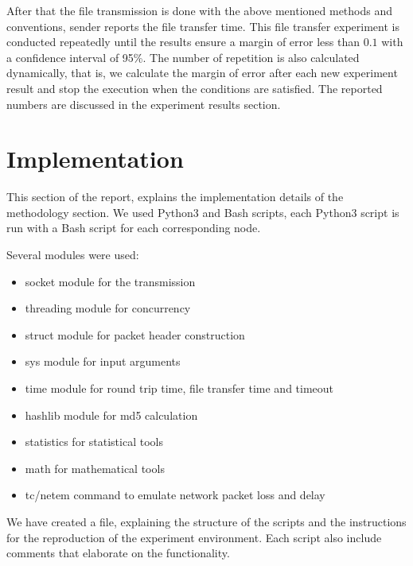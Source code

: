 \documentclass[conference]{IEEEtran}
\begin{document}
    After that the file transmission is done with the above mentioned methods and conventions, sender reports the file transfer time. This file transfer experiment is conducted repeatedly until the results ensure a margin of error less than $0.1$ with a confidence interval of 95\%. The number of repetition is also calculated dynamically, that is, we calculate the margin of error after each new experiment result and stop the execution when the conditions are satisfied. The reported numbers are discussed in the experiment results section.
    
\section{Implementation}

    
        This section of the report, explains the implementation details of the methodology section. We used Python3 and Bash scripts, each Python3 script  is run with a Bash script  for each corresponding node.
    
        Several modules were used:
            \begin{itemize}
                \item socket module for the transmission
                \item threading module for concurrency
                \item struct module for packet header construction
                \item sys module for input arguments
                \item time module for round trip time, file transfer time and timeout
                \item hashlib module for md5 calculation
                \item statistics for statistical tools
                \item math for mathematical tools 
                \item tc/netem command to emulate network packet loss and delay
            \end{itemize}
        
        We have created a  file, explaining the structure of the scripts and the instructions for the reproduction of the experiment environment. Each script also include comments that elaborate on the functionality.
      
      
\end{document}
